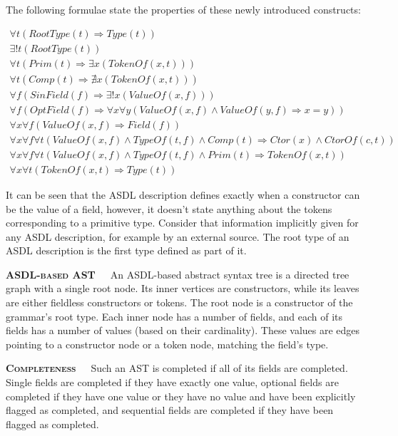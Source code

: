 \noindent
The following formulae state the properties of these newly introduced constructs:

\begingroup
\allowdisplaybreaks
\vspace{-.5cm}
\begin{gather*}
\forall t(RootType(t) \Rightarrow Type(t)) \\
\exists! t(RootType(t)) \\
\forall t(Prim(t) \Rightarrow \exists x(TokenOf(x, t))) \\
\forall t(Comp(t) \Rightarrow \nexists x(TokenOf(x, t))) \\
\forall f(SinField(f) \Rightarrow \exists! x(ValueOf(x, f))) \\
\forall f(OptField(f) \Rightarrow \forall x \forall y(ValueOf(x, f) 
\land ValueOf(y, f) \Rightarrow x = y)) \\
\forall x \forall f(ValueOf(x, f) \Rightarrow Field(f)) \\
\forall x \forall f \forall t(ValueOf(x, f) \land
TypeOf(t, f) \land Comp(t) \Rightarrow Ctor(x) \land CtorOf(c, t)) \\
\forall x \forall f \forall t(ValueOf(x, f) \land TypeOf(t, f)
\land Prim(t) \Rightarrow TokenOf(x, t)) \\
\forall x \forall t(TokenOf(x, t) \Rightarrow Type(t))
\end{gather*}
\endgroup

\noindent
It can be seen that the ASDL description defines exactly when a constructor can be
the value of a field, however, it doesn't state anything about the tokens corresponding
to a primitive type. Consider that information implicitly given for any ASDL
description, for example by an external source. The root type of an ASDL
description is the first type defined as part of it.

\textbf{\textsc{ASDL-based AST}}\ \ \ An ASDL-based abstract syntax tree is a
directed tree graph with a single root node. Its inner vertices are constructors,
while its leaves are either fieldless constructors or tokens. The root node is a
constructor of the grammar's root type. Each inner node has a number of fields,
and each of its fields has a number of values (based on their cardinality).
These values are edges pointing to a constructor node or a token node,
matching the field's type.

\textbf{\textsc{Completeness}}\ \ \ Such an AST is completed if all of its fields
are completed. Single fields are completed if they have exactly one value,
optional fields are completed if they have one value or they have no value
and have been explicitly flagged as completed, and sequential fields are
completed if they have been flagged as completed.

